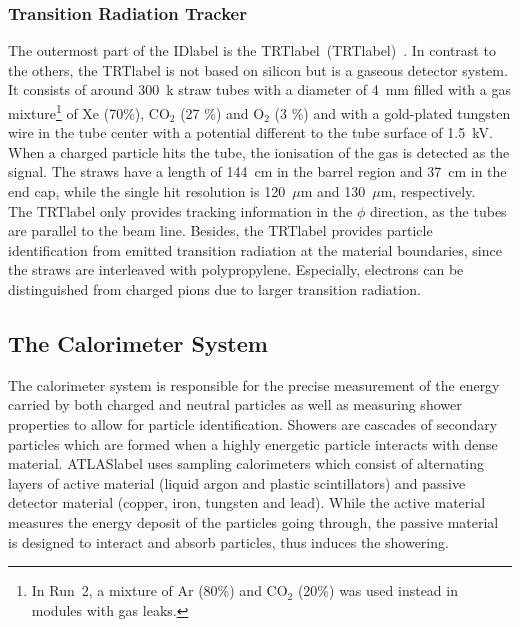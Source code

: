 \subsubsection*{Transition Radiation Tracker}

The outermost part of the \acrshort{IDlabel} is the \acrlong{TRTlabel}~(\acrshort{TRTlabel})~\cite{MITSOU_2004,TRTRun1}. In contrast to the others, the \acrshort{TRTlabel} is not based on silicon but is a gaseous detector system. It consists of around 300~k straw tubes with a diameter of 4~mm filled with a gas mixture\footnote{In Run~2, a mixture of Ar (80\%) and CO$_2$ (20\%) was used instead in modules with gas leaks.} of Xe (70\%), CO$_2$ (27 \%) and O$_2$ (3 \%) and with a gold-plated tungsten wire in the tube center with a potential different to the tube surface of 1.5~kV. When a charged particle hits the tube, the ionisation of the gas is detected as the signal. The straws have a length of 144~cm in the barrel region and 37~cm in the end cap, while the single hit resolution is 120~$\mu$m and 130~$\mu$m, respectively.\\

The \acrshort{TRTlabel} only provides tracking information in the $\phi$ direction, as the tubes are parallel to the beam line. Besides, the \acrshort{TRTlabel} provides particle identification from emitted transition radiation at the material boundaries, since the straws are interleaved with polypropylene. Especially, electrons can be distinguished from charged pions due to larger transition radiation.


\subsection{The Calorimeter System}

The calorimeter system is responsible for the precise measurement of the energy carried by both charged and neutral particles as well as measuring shower properties to allow for particle identification. Showers are cascades of secondary particles which are formed when a highly energetic particle interacts with dense material. \acrshort{ATLASlabel} uses sampling calorimeters which consist of alternating layers of active material (liquid argon and plastic scintillators) and passive detector material (copper, iron, tungsten and lead). While the active material measures the energy deposit of the particles going through, the passive material is designed to interact and absorb particles, thus induces the showering.\\

